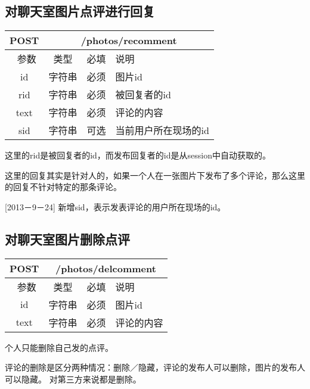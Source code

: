 \subsection{对聊天室图片点评进行回复}

\begin{table}[H]
   \begin{center}
\begin{tabular}{|c|c|c|p{12cm}|}
\hline
POST & \multicolumn{3}{|c|}{/photos/recomment} \\
\hline\hline
 \  参数  & 类型 & 必填 &  说明  \\
  \hline
 id  & 字符串 & 必须 & 图片id\\
 \hline
 rid  & 字符串 & 必须 & 被回复者的id\\
   \hline
 text  & 字符串 & 必须 & 评论的内容\\
  \hline
 sid  & 字符串 & 可选 & 当前用户所在现场的id\\  
\hline
\end{tabular}
   \end{center}
\end{table}
这里的rid是被回复者的id，而发布回复者的id是从session中自动获取的。

这里的回复其实是针对人的，如果一个人在一张图片下发布了多个评论，那么这里的回复不针对特定的那条评论。

[2013－9－24] 新增sid，表示发表评论的用户所在现场的id。


\subsection{对聊天室图片删除点评}

\begin{table}[H]
   \begin{center}
\begin{tabular}{|c|c|c|p{12cm}|}
\hline
POST & \multicolumn{3}{|c|}{/photos/delcomment} \\
\hline\hline
 \  参数  & 类型 & 必填 &  说明  \\
  \hline
 id  & 字符串 & 必须 & 图片id\\
  \hline
 text  & 字符串 & 必须 & 评论的内容\\
\hline
\end{tabular}
   \end{center}
\end{table}
个人只能删除自己发的点评。

评论的删除是区分两种情况：删除／隐藏，评论的发布人可以删除，图片的发布人可以隐藏。
对第三方来说都是删除。

